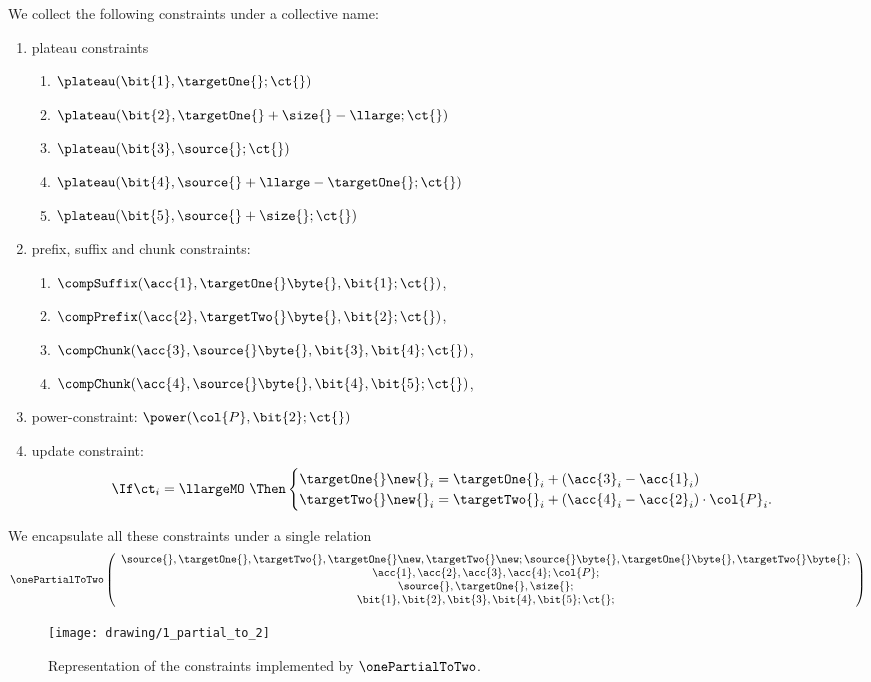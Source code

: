 We collect the following constraints under a collective name: %
\begin{enumerate}
	\item plateau constraints
		\begin{enumerate}
			\item $\plateau(\bit{1}, \targetOne{}\mark{}; \ct{})$
			\item $\plateau(\bit{2}, \targetOne{}\mark{} + \size{} - \llarge; \ct{})$
			\item $\plateau(\bit{3}, \source{}\mark{}; \ct{})$
			\item $\plateau(\bit{4}, \source{}\mark{} + \llarge - \targetOne{}\mark{}; \ct{})$
			\item $\plateau(\bit{5}, \source{}\mark{} + \size{}; \ct{})$
		\end{enumerate}
	\item prefix, suffix and chunk constraints:
		\begin{enumerate}
			\item $\compSuffix(\acc{1}, \targetOne{}\byte{}, \bit{1}; \ct{})$, %
			\item $\compPrefix(\acc{2}, \targetTwo{}\byte{}, \bit{2}; \ct{})$, %
			\item $\compChunk(\acc{3}, \source{}\byte{}, \bit{3}, \bit{4}; \ct{})$, %
			\item $\compChunk(\acc{4}, \source{}\byte{}, \bit{4}, \bit{5}; \ct{})$, %
		\end{enumerate}
	\item power-constraint: $\power(\col{P},\bit{2}; \ct{})$
	\item update constraint:
		\[
			\If
			\ct_i = \llargeMO~
			\Then
			\begin{cases}
				\targetOne{}\new{}_i
				=
				\targetOne{}_i
				+
				(\acc{3}_i - \acc{1}_i)\\
				\targetTwo{}\new{}_i
				=
				\targetTwo{}_i
				+
				(\acc{4}_i - \acc{2}_i)\cdot\col{P}_i.
			\end{cases}
		\]
\end{enumerate}
We encapsulate all these constraints under a single relation
\[
	\onePartialToTwo
	\left( \begin{array}{c}
		\source{}, \targetOne{}, \targetTwo{},
		\targetOne{}\new, \targetTwo{}\new;
		\source{}\byte{}, \targetOne{}\byte{}, \targetTwo{}\byte{};
		\\
		\acc{1}, \acc{2}, \acc{3}, \acc{4}; \col{P};
		\\
		\source{}\mark{}, \targetOne{}\mark{}, \size{};
		\\
		\bit{1}, \bit{2}, \bit{3}, \bit{4}, \bit{5}; \ct{};
	\end{array} \right)
\]

\begin{figure}[h!]
	\centering
	\texttt{[image: drawing/1\_partial\_to\_2]}
	\label{fig: one partial to two}
	\caption{Representation of the constraints implemented by $\onePartialToTwo$.}
\end{figure}

